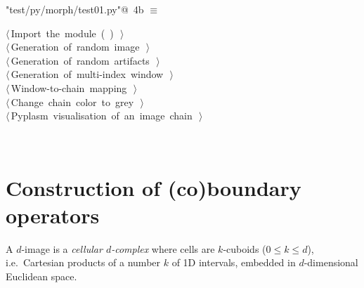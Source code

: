\documentclass[11pt,oneside]{article}	%
\begin{document}
\begin{flushleft} \small
\begin{minipage}{\linewidth} \label{scrap6}
\protect{}\verb@"test/py/morph/test01.py"@\nobreak\ {\footnotesize 4b }$\equiv$
\vspace{-1ex}
\begin{list}{}{} \item
\mbox{}\verb@@\hbox{$\langle\,$Import the module\nobreak\ ({\footnotesize {}\label{scrap7}
 }\mbox{}\verb@largrid@ ) {\footnotesize {}}$\,\rangle$}\verb@@\\
\mbox{}\verb@@\hbox{$\langle\,$Generation of random image\nobreak\ {\footnotesize {}}$\,\rangle$}\verb@@\\
\mbox{}\verb@@\hbox{$\langle\,$Generation of random artifacts\nobreak\ {\footnotesize {}}$\,\rangle$}\verb@@\\
\mbox{}\verb@@\hbox{$\langle\,$Generation of multi-index window\nobreak\ {\footnotesize {}}$\,\rangle$}\verb@@\\
\mbox{}\verb@@\hbox{$\langle\,$Window-to-chain mapping\nobreak\ {\footnotesize {}}$\,\rangle$}\verb@@\\
\mbox{}\verb@@\hbox{$\langle\,$Change chain color to grey\nobreak\ {\footnotesize {}}$\,\rangle$}\verb@@\\
\mbox{}\verb@@\hbox{$\langle\,$Pyplasm visualisation of an image chain\nobreak\ {\footnotesize {}}$\,\rangle$}\verb@@\\
\mbox{}\verb@@{\NWsep}
\end{list}
\vspace{-2ex}
\end{minipage}\\[4ex]
\end{flushleft}

\section{Construction of (co)boundary operators}

A $d$-image is a \emph{cellular $d$-complex} where cells are $k$-cuboids ($0\leq k\leq d$), i.e.~Cartesian products of a number $k$ of 1D intervals, embedded in $d$-dimensional Euclidean space. 
\end{document}

